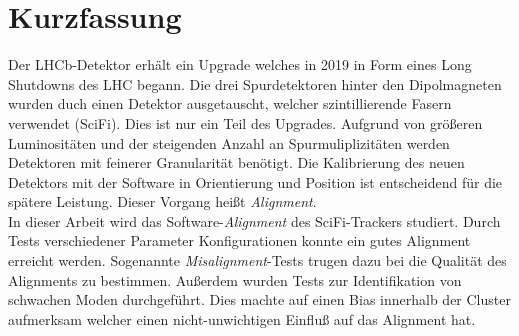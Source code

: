 \chapter*{Kurzfassung}
\label{sec:kurzf}

Der LHCb-Detektor erhält ein Upgrade welches in 2019 in Form eines Long
Shutdowns des LHC begann. Die drei Spurdetektoren hinter den Dipolmagneten wurden
duch einen Detektor ausgetauscht, welcher szintillierende Fasern verwendet (SciFi).
Dies ist nur ein Teil des Upgrades. Aufgrund von größeren Luminositäten und der
steigenden Anzahl an Spurmuliplizitäten werden Detektoren mit feinerer
Granularität benötigt. Die Kalibrierung des neuen Detektors mit der Software in
Orientierung und Position ist entscheidend für die spätere Leistung. Dieser
Vorgang heißt \textit{Alignment}.
\\
In dieser Arbeit wird das Software-\textit{Alignment} des SciFi-Trackers studiert.
Durch Tests verschiedener Parameter Konfigurationen konnte ein gutes
Alignment erreicht werden. Sogenannte \textit{Misalignment}-Tests trugen dazu
bei die Qualität des Alignments zu bestimmen. Außerdem wurden Tests zur
Identifikation von schwachen Moden durchgeführt.
Dies machte auf einen Bias innerhalb der Cluster aufmerksam welcher einen
nicht-unwichtigen Einfluß auf das Alignment hat.
